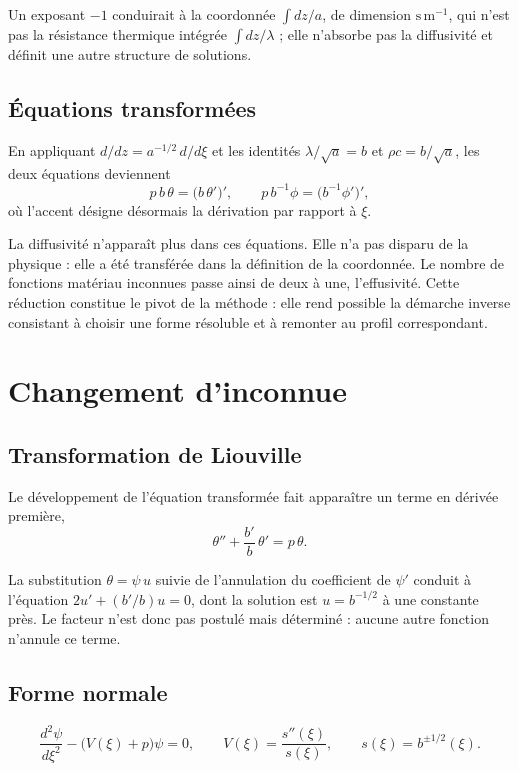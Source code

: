 \documentclass[11pt,a4paper]{article}
\begin{document}
Un exposant $-1$ conduirait à la coordonnée $\int dz/a$, de dimension $\mathrm{s\,m^{-1}}$, qui n'est
pas la résistance thermique intégrée $\int dz/\lambda$ ; elle n'absorbe pas la diffusivité et définit
une autre structure de solutions.

\subsection{Équations transformées}

En appliquant $d/dz = a^{-1/2}\,d/d\xi$ et les identités $\lambda/\sqrt{a} = b$ et
$\rho c = b/\sqrt{a}$, les deux équations deviennent
\[ p\,b\,\theta = \bigl(b\,\theta'\bigr)' , \qquad p\,b^{-1}\phi = \bigl(b^{-1}\phi'\bigr)' , \]
où l'accent désigne désormais la dérivation par rapport à $\xi$.

La diffusivité n'apparaît plus dans ces équations. Elle n'a pas disparu de la physique : elle a été
transférée dans la définition de la coordonnée. Le nombre de fonctions matériau inconnues passe ainsi
de deux à une, l'effusivité. Cette réduction constitue le pivot de la méthode : elle rend possible la
démarche inverse consistant à choisir une forme résoluble et à remonter au profil correspondant.

\section{Changement d'inconnue}

\subsection{Transformation de Liouville}

Le développement de l'équation transformée fait apparaître un terme en dérivée première,
\[ \theta'' + \frac{b'}{b}\,\theta' = p\,\theta . \]

La substitution $\theta = \psi\,u$ suivie de l'annulation du coefficient de $\psi'$ conduit à
l'équation $2u' + (b'/b)u = 0$, dont la solution est $u = b^{-1/2}$ à une constante près. Le facteur
n'est donc pas postulé mais déterminé : aucune autre fonction n'annule ce terme.

\subsection{Forme normale}

\[ \frac{d^{2}\psi}{d\xi^{2}} - \bigl(V(\xi) + p\bigr)\psi = 0 ,
\qquad V(\xi) = \frac{s''(\xi)}{s(\xi)} , \qquad s(\xi) = b^{\pm 1/2}(\xi) . \]
\end{document}
